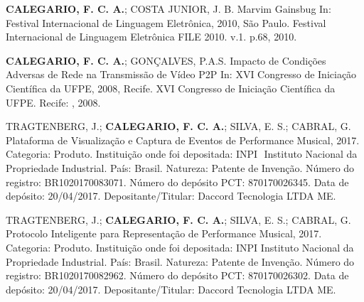 \begin{cvparagraph}
\textbf{CALEGARIO, F. C. A.}; COSTA JUNIOR, J. B. Marvim Gainsbug In: Festival Internacional de Linguagem Eletrônica, 2010, São Paulo. Festival Internacional de Linguagem Eletrônica FILE 2010. v.1. p.68, 2010.
\end{cvparagraph}
\begin{cvparagraph}
\textbf{CALEGARIO, F. C. A.}; GONÇALVES, P.A.S. Impacto de Condições Adversas de Rede na Transmissão de Vídeo P2P In: XVI Congresso de Iniciação Científica da UFPE, 2008, Recife. XVI Congresso de Iniciação Científica da UFPE. Recife: , 2008.
\end{cvparagraph}


\begin{cvparagraph}
TRAGTENBERG, J.; \textbf{CALEGARIO, F. C. A.}; SILVA, E. S.; CABRAL, G. Plataforma de Visualização e Captura de Eventos de Performance Musical, 2017. Categoria: Produto. Instituição onde foi depositada: INPI ­ Instituto Nacional da Propriedade Industrial. País: Brasil. Natureza: Patente de Invenção. Número do registro: BR1020170083071. Número do depósito PCT: 870170026345. Data de depósito: 20/04/2017. Depositante/Titular: Daccord Tecnologia LTDA ME.
\end{cvparagraph}
\begin{cvparagraph}
TRAGTENBERG, J.; \textbf{CALEGARIO, F. C. A.}; SILVA, E. S.; CABRAL, G. Protocolo Inteligente para Representação de Performance Musical, 2017. Categoria: Produto. Instituição onde foi depositada: INPI ­ Instituto Nacional da Propriedade Industrial. País: Brasil. Natureza: Patente de Invenção. Número do registro: BR1020170082962. Número do depósito PCT: 870170026302. Data de depósito: 20/04/2017. Depositante/Titular: Daccord Tecnologia LTDA ME.
\end{cvparagraph}


